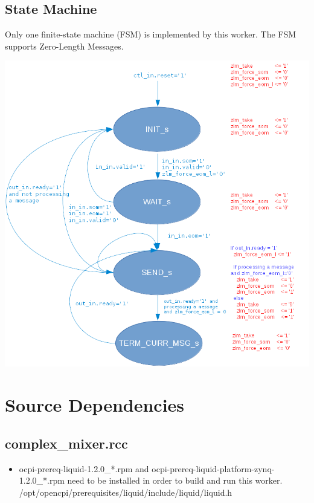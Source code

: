 \documentclass{article}
\def\comp{complex\_mixer}
\begin{document}
\newpage
\subsection*{State Machine}
	\begin{flushleft}
		Only one finite-state machine (FSM) is implemented by this worker. The FSM supports Zero-Length Messages.
	\end{flushleft}
	{\centering\captionsetup{type=figure}\includegraphics[scale=0.45]{complex_mixer_zlm_fsm}
	\label{fig:zlm_fsm}}

\newpage
\section*{Source Dependencies}
\subsection*{\comp.rcc}
\begin{itemize}
   \item ocpi-prereq-liquid-1.2.0\_*.rpm and 	ocpi-prereq-liquid-platform-zynq-1.2.0\_*.rpm need to be installed in order to build and run this worker.
   \subitem /opt/opencpi/prerequisites/liquid/include/liquid/liquid.h
\end{itemize}
\end{document}
